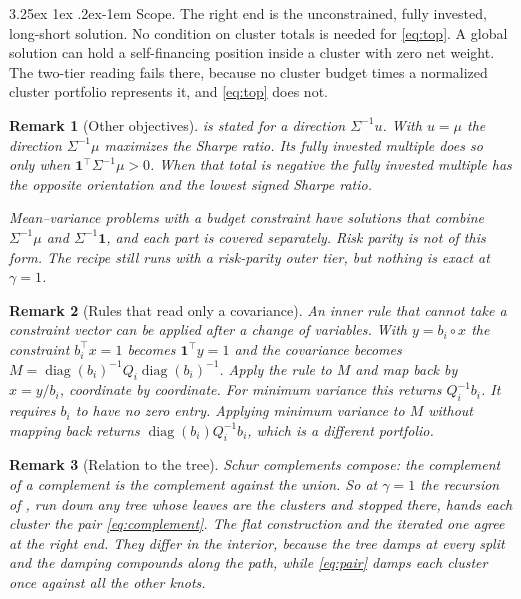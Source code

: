 \documentclass[11pt]{article}
\makeatletter
\renewcommand\paragraph{\@startsection{paragraph}{4}{\z@}%
  {3.25ex \@plus1ex \@minus.2ex}{-1em}%
  {\normalfont\normalsize\itshape}}
\newcommand{\ones}{\mathbf{1}}
\DeclareMathOperator{\diag}{diag}
\newtheorem{remark}{Remark}
\makeatother
\begin{document}
\paragraph{Scope.} The right end is the unconstrained, fully invested,
long-short solution. No condition on cluster totals is needed for
\eqref{eq:top}. A global solution can hold a self-financing position inside
a cluster with zero net weight. The two-tier reading fails there, because
no cluster budget times a normalized cluster portfolio represents it, and
\eqref{eq:top} does not.

\begin{remark}[Other objectives]
 is stated for a direction $\Sigma^{-1}u$. With $u=\mu$
the direction $\Sigma^{-1}\mu$ maximizes the Sharpe ratio. Its fully
invested multiple does so only when $\ones^\top\Sigma^{-1}\mu>0$. When that
total is negative the fully invested multiple has the opposite orientation
and the lowest signed Sharpe ratio.

Mean--variance problems with a budget
constraint have solutions that combine $\Sigma^{-1}\mu$ and
$\Sigma^{-1}\ones$, and each part is covered separately. Risk parity is not
of this form. The recipe still runs with a risk-parity outer tier, but
nothing is exact at $\gamma=1$.
\end{remark}

\begin{remark}[Rules that read only a covariance]
An inner rule that cannot take a constraint vector can be applied after a
change of variables. With $y=b_i\circ x$ the constraint $b_i^\top x=1$
becomes $\ones^\top y=1$ and the covariance becomes
$M=\diag(b_i)^{-1}Q_i\diag(b_i)^{-1}$. Apply the rule to $M$ and map back by
$x=y/b_i$, coordinate by coordinate. For minimum variance this returns
$Q_i^{-1}b_i$. It requires $b_i$ to have no zero entry. Applying minimum
variance to $M$ without mapping back returns $\diag(b_i)Q_i^{-1}b_i$, which
is a different portfolio.
\end{remark}

\begin{remark}[Relation to the tree]
Schur complements compose: the complement of a complement is the complement
against the union. So at $\gamma=1$ the recursion of
\cite{cotton2024schur}, run down any tree whose leaves are the clusters
and stopped there, hands each cluster the pair \eqref{eq:complement}. The
flat construction and the iterated one agree at the right end. They differ
in the interior, because the tree damps at every split and the damping
compounds along the path, while \eqref{eq:pair} damps each cluster once
against all the other knots.
\end{remark}
\end{document}
